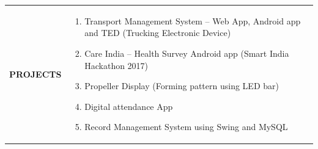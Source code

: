 \documentclass{article}
\begin{document}
\begin{table}[h!]
    \begin{tabular}{l  p{}} 
      \textbf{\Large{PROJECTS}} & 
	\begin{enumerate}
	\item Transport Management System – Web App, Android app and TED (Trucking Electronic Device)
	\item Care India – Health Survey Android app (Smart India Hackathon 2017)
	\item Propeller Display (Forming pattern using LED bar)
	\item Digital attendance App
	\item Record Management System using Swing and MySQL
   	\end{enumerate} 
    \end{tabular}
\end{table}
\end{document}
